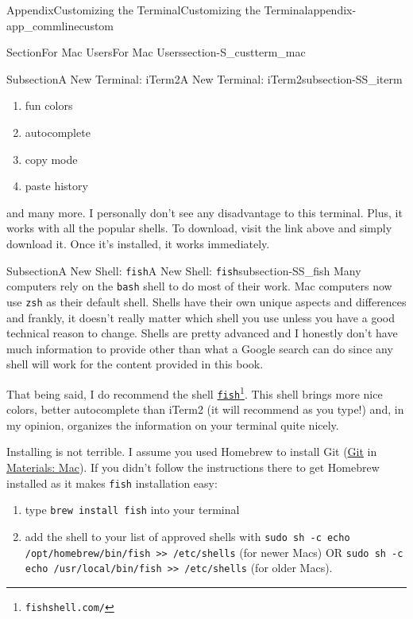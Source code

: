 \documentclass[oneside,10pt,]{book}
\newcommand{\mono}[1]{\texttt{#1}}
\begin{document}
\begin{appendixptx}{Appendix}{Customizing the Terminal}{}{Customizing the Terminal}{}{}{appendix-app_commlinecustom}
\begin{sectionptx}{Section}{For Mac Users}{}{For Mac Users}{}{}{section-S_custterm_mac}
\begin{subsectionptx}{Subsection}{A New Terminal: iTerm2}{}{A New Terminal: iTerm2}{}{}{subsection-SS_iterm}
\begin{enumerate}
\item{}fun colors%
\item{}autocomplete%
\item{}copy mode%
\item{}paste history%
\end{enumerate}
and many more. I personally don't see any disadvantage to this terminal. Plus, it works with all the popular shells. To download, visit the link above and simply download it. Once it's installed, it works immediately.%
\end{subsectionptx}
%
%
\typeout{************************************************}
\typeout{Subsection A.1.2 A New Shell: \mono{fish}}
\typeout{************************************************}
%
\begin{subsectionptx}{Subsection}{A New Shell: \mono{fish}}{}{A New Shell: \mono{fish}}{}{}{subsection-SS_fish}
%
%
Many computers rely on the \mono{bash} shell to do most of their work. Mac computers now use \mono{zsh} as their default shell. Shells have their own unique aspects and differences and frankly, it doesn't really matter which shell you use unless you have a good technical reason to change. Shells are pretty advanced and I honestly don't have much information to provide other than what a Google search can do since any shell will work for the content provided in this book.%
\par
That being said, I do recommend the shell \href{https://fishshell.com/}{\mono{fish}}\footnote{\nolinkurl{fishshell.com/}\label{fn-SS_fish-e-b}}. This shell brings more nice colors, better autocomplete than iTerm2 (it will recommend as you type!) and, in my opinion, organizes the information on your terminal quite nicely.%
\par
Installing is not terrible. I assume you used Homebrew to install Git (\hyperlink{paragraphs-install-git-mac}{Git} in \hyperref[preface-materials-mac]{Materials: Mac}). If you didn't follow the instructions there to get Homebrew installed as it makes \mono{fish} installation easy:%
\begin{enumerate}
\item{}type \mono{brew install fish} into your terminal%
\item{}add the shell to your list of approved shells with \mono{sudo sh -c \textquotesingle{}echo /opt/homebrew/bin/fish >> /etc/shells\textquotesingle{}} (for newer Macs) OR \mono{sudo sh -c \textquotesingle{}echo /usr/local/bin/fish >> /etc/shells\textquotesingle{}} (for older Macs).%

\end{enumerate}
\end{subsectionptx}
\end{sectionptx}
\end{appendixptx}
\end{document}
